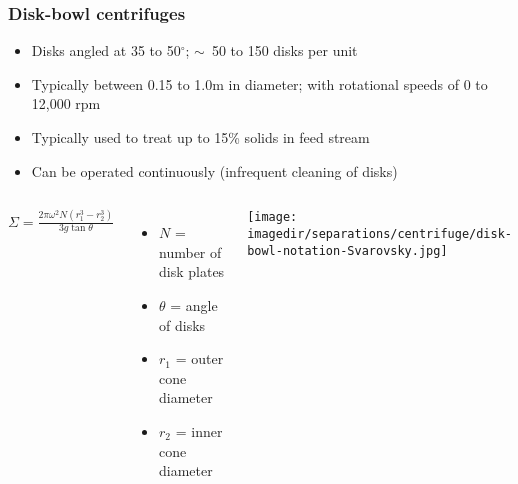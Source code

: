 \begin{frame}\frametitle{Disk-bowl centrifuges}
	\begin{itemize}
		\item	Disks angled at 35 to 50$^\circ$; $\sim$~50 to 150 disks per unit
		\item	Typically between 0.15 to 1.0m in diameter; with rotational speeds of 0 to 12,000 rpm
		\item	Typically used to treat up to 15\% solids in feed stream
		\item	Can be operated continuously (infrequent cleaning of disks)
	\end{itemize}
	\vspace{-12pt}
	\begin{columns}[c]
			$\Sigma = \displaystyle \frac{2\pi\omega^2 N(r_1^3 - r_2^3)}{3g \tan \theta}$
			\vspace{24pt}
			\begin{itemize}
				\item	$N$ = number of disk plates
				\item	$\theta$ = angle of disks
				\item	$r_1$ = outer cone diameter
				\item	$r_2$ = inner cone diameter
			\end{itemize}
			\begin{center}
				\texttt{[image: \\imagedir/separations/centrifuge/disk-bowl-notation-Svarovsky.jpg]}
			\end{center}
	\end{columns}
\end{frame}

% 	
% 	

